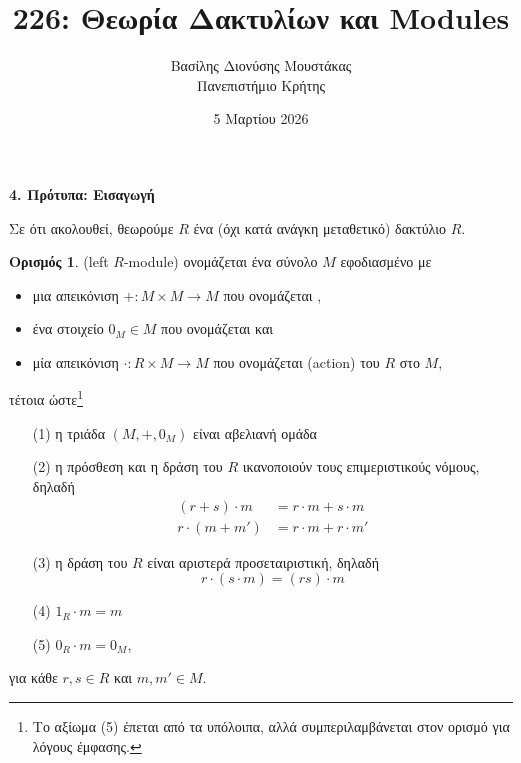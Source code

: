 \documentclass[12pt,a4paper,reqno]{amsart}
\title{226: Θεωρία Δακτυλίων και Modules}
\author[Β.~Δ. Μουστακας]{Βασίλης Διονύσης Μουστάκας \\ Πανεπιστήμιο Κρήτης}
\date{5 Μαρτίου 2026}
\theoremstyle{definition}
\newtheorem{definition}[theorem]{Ορισμός}
\theoremstyle{remark}
\numberwithin{theorem}{section}
\numberwithin{exercise}{section}
\numberwithin{equation}{section}
\renewcommand{\to}{\rightarrow}
\newcommand{\defn}[1]{{\color{mylightblue}{#1}}}
\begin{document}
\begingroup
\def\uppercasenonmath#1{} %
\let\MakeUppercase\relax %
\maketitle
\endgroup

\setcounter{section}{4}
\begin{center}
    \textbf{4. Πρότυπα: Εισαγωγή
} 
\end{center}

Σε ότι ακολουθεί, θεωρούμε $R$ ένα (όχι κατά ανάγκη μεταθετικό) δακτύλιο $R$.

\begin{definition}
    \label{def:module} 
    \defn{Αριστερό $R$-πρότυπο} (left $R$-module) ονομάζεται ένα σύνολο $M$ εφοδιασμένο με 
    \begin{itemize}
        \item μια απεικόνιση $+ : M \times M \to M$ που ονομάζεται \defn{πρόσθεση},
        \item ένα στοιχείο $0_M \in M$ που ονομάζεται \defn{μηδέν} και
        \item μία απεικόνιση $\cdot : R\times{M} \to M$ που ονομάζεται \defn{δράση} (action) του $R$ στο $M$,
    \end{itemize}
    τέτοια ώστε\footnote{Το αξίωμα (5) έπεται από τα υπόλοιπα, αλλά συμπεριλαμβάνεται στον ορισμό για λόγους έμφασης.} 
    \begin{itemize}
        \item[(1)] η τριάδα $(M,+,0_M)$ είναι αβελιανή ομάδα
        \item[(2)] η πρόσθεση και η δράση του $R$ ικανοποιούν τους επιμεριστικούς νόμους, δηλαδή
        \begin{align*}
            (r+s)\cdot{m} &= r\cdot{m} + s\cdot{m} \\
            r\cdot(m+m') &= r\cdot{m} + r\cdot{m'} 
        \end{align*}
        \item[(3)] η δράση του $R$ είναι αριστερά προσεταιριστική, δηλαδή 
        \[
        r\cdot(s\cdot{m}) = (rs)\cdot{m}
        \]
        \item[(4)] $1_R\cdot{m} = m$
        \item[(5)] $0_R\cdot{m} = 0_M$,
    \end{itemize}
    για κάθε $r, s \in R$ και $m, m' \in M$.
\end{definition}
\end{document}
